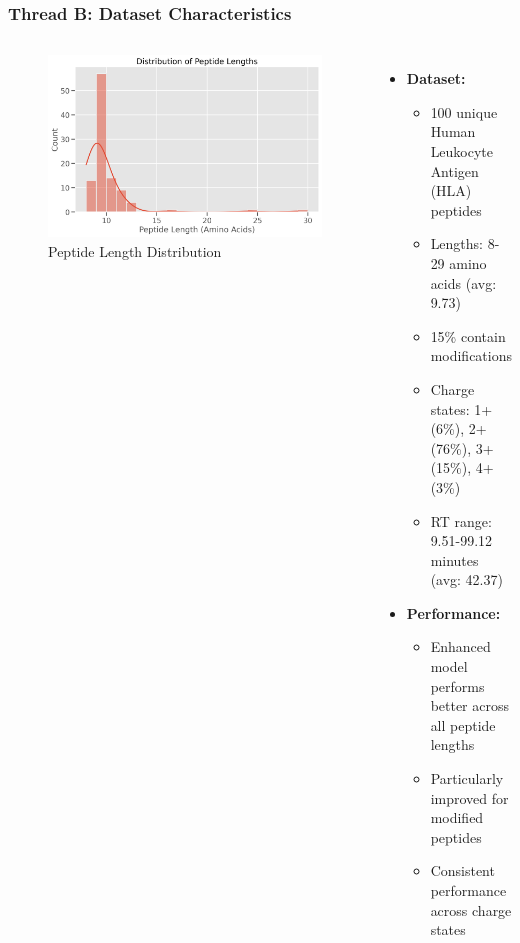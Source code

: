 \documentclass{beamer}
\begin{document}
\begin{frame}
  \frametitle{Thread B: Dataset Characteristics}
  \begin{columns}
      \begin{figure}
        \includegraphics[width=0.95\linewidth]{hla_uncertainty_results/enhanced_analysis/peptide_length_distribution.png}
        \caption{Peptide Length Distribution}
      \end{figure}
      \begin{itemize}
        \item \textbf{Dataset:}
        \begin{itemize}
          \item 100 unique Human Leukocyte Antigen (HLA) peptides
          \item Lengths: 8-29 amino acids (avg: 9.73)
          \item 15\% contain modifications
          \item Charge states: 1+ (6\%), 2+ (76\%), 3+ (15\%), 4+ (3\%)
          \item RT range: 9.51-99.12 minutes (avg: 42.37)
        \end{itemize}
        \item \textbf{Performance:}
        \begin{itemize}
          \item Enhanced model performs better across all peptide lengths
          \item Particularly improved for modified peptides
          \item Consistent performance across charge states
        \end{itemize}
      \end{itemize}
  \end{columns}
\end{frame}
\end{document}
